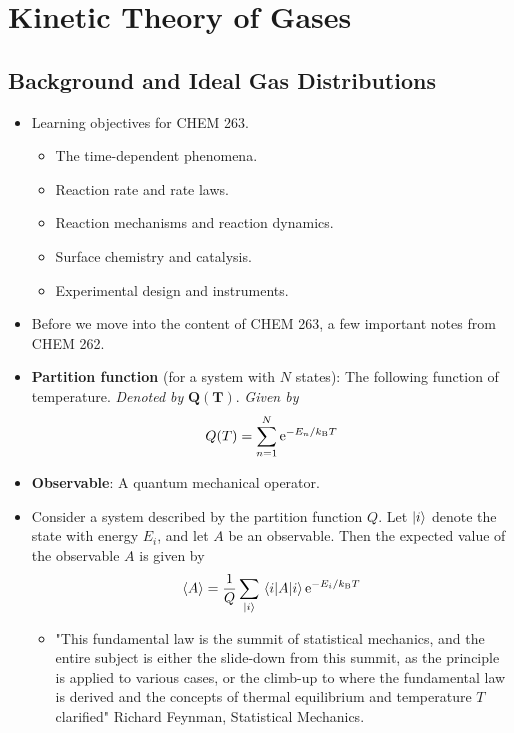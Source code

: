 \documentclass[../notes.tex]{subfiles}
\begin{document}
\chapter{Kinetic Theory of Gases}
\section{Background and Ideal Gas Distributions}
\begin{itemize}
    \item {}Learning objectives for CHEM 263.
    \begin{itemize}
        \item The time-dependent phenomena.
        \item Reaction rate and rate laws.
        \item Reaction mechanisms and reaction dynamics.
        \item Surface chemistry and catalysis.
        \item Experimental design and instruments.
    \end{itemize}
    \item Before we move into the content of CHEM 263, a few important notes from CHEM 262.
    \item \textbf{Partition function} (for a system with $N$ states): The following function of temperature. \emph{Denoted by} $\bm{Q(T)}$. \emph{Given by}
    \begin{equation*}
        Q(T) = \sum_{n=1}^N\e[-E_n/\kB T]
    \end{equation*}
    \item \textbf{Observable}: A quantum mechanical operator.
    \item Consider a system described by the partition function $Q$. Let $\ket{i}$ denote the state with energy $E_i$, and let $A$ be an observable. Then the expected value of the observable $A$ is given by
    \begin{equation*}
        \prb{A} = \frac{1}{Q}\sum_{\ket{i}}\ev{A}{i}\e[-E_i/\kB T]
    \end{equation*}
    \begin{itemize}
        \item "This fundamental law is the summit of statistical mechanics, and the entire subject is either the slide-down from this summit, as the principle is applied to various cases, or the climb-up to where the fundamental law is derived and the concepts of thermal equilibrium and temperature $T$ clarified" Richard Feynman, Statistical Mechanics.

\end{itemize}
\end{itemize}
\end{document}
